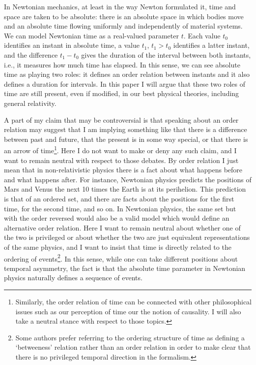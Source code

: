\documentclass[12 pt]{article}
\begin{document}
In Newtonian mechanics, at least in the way Newton formulated it, time and space are taken to be absolute: there is an absolute space in which bodies move and an absolute time flowing uniformly and independently of material systems. We can model Newtonian time as a real-valued parameter $t$. Each value $t_0$ identifies an instant in absolute time, a value $t_1$, $t_1>t_0$ identifies a latter instant, and the difference $t_1-t_0$ gives the duration of the interval between both instants, i.e., it measures how much time has elapsed. In this sense, we can see absolute time as playing two roles: it defines an order relation between instants and it also defines a duration for intervals. In this paper I will argue that these two roles of time are still present, even if modified, in our best physical theories, including general relativity.

A part of my claim that may be controversial is that speaking about an order relation may suggest that I am implying something like that there is a difference between past and future, that the present is in some way special, or that there is an arrow of time\footnote{Similarly, the order relation of time can be connected with other philosophical issues such as our perception of time our the notion of causality. I will also take a neutral stance with respect to those topics.}. Here I do not want to make or deny any such claim, and I want to remain neutral with respect to those debates. By order relation I just mean that in non-relativistic physics there is a fact about what happens before and what happens after. For instance, Newtonian physics predicts the positions of Mars and Venus the next 10 times the Earth is at its perihelion. This prediction is that of an ordered set, and there are facts about the positions for the first time, for the second time, and so on. In Newtonian physics, the same set but with the order reversed would also be a valid model which would define an alternative order relation. Here I want to remain neutral about whether one of the two is privileged or about whether the two are just equivalent representations of the same physics, and I want to insist that time is directly related to the ordering of events\footnote{Some authors prefer referring to the ordering structure of time as defining a `betweeness' relation rather than an order relation in order to make clear that there is no privileged temporal direction in the formalism.}. In this sense, while one can take different positions about temporal asymmetry, the fact is that the absolute time parameter in Newtonian physics naturally defines a sequence of events.
\end{document}
